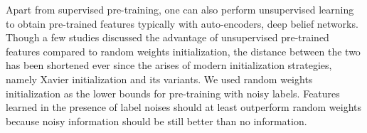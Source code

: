 


Apart from supervised pre-training, one can also perform unsupervised learning to obtain pre-trained features typically with auto-encoders\cite{vincent2010stacked,masci2011stacked}, deep belief networks\cite{hinton2006fast,lee2009convolutional}.
Though a few studies\cite{erhan2009difficulty,erhan2010does,bengio2012deep} discussed the advantage of unsupervised pre-trained features compared to random weights initialization, the distance between the two has been shortened ever since the arises of modern initialization strategies, namely Xavier initialization\cite{glorot2010understanding} and its variants.
We used random weights initialization as the lower bounds for pre-training with noisy labels.
Features learned in the presence of label noises should at least outperform random weights because noisy information should be still better than no information.

